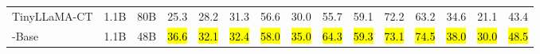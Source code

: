 \begin{table*}[t]
{\begin{tabular}{lcc|ccccccccccc|c}
TinyLLaMA-CT & 1.1B & 80B & 25.3 & 28.2 & 31.3 & 56.6 & 30.0 & 55.7 & 59.1 & 72.2 & 63.2 & 34.6 & 21.1 & 43.4 \\
\model{}-Base & 1.1B & 48B & \hl{36.6} & \hl{32.1} & \hl{32.4} & \hl{58.0} & \hl{35.0} & \hl{64.3} & \hl{59.3} & \hl{73.1} & \hl{74.5} & \hl{38.0} & \hl{30.0} & \hl{48.5} \\
\bottomrule
\end{tabular}
}
\end{table*}

